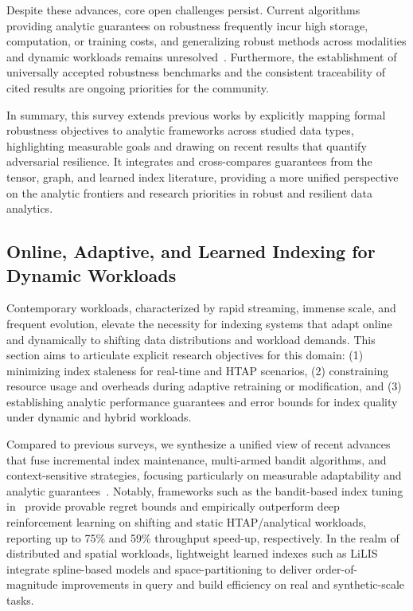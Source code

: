 \documentclass[sigconf]{acmart}
\begin{document}
Despite these advances, core open challenges persist. Current algorithms providing analytic guarantees on robustness frequently incur high storage, computation, or training costs, and generalizing robust methods across modalities and dynamic workloads remains unresolved~\cite{ref104,ref107,ref110,ref118}. Furthermore, the establishment of universally accepted robustness benchmarks and the consistent traceability of cited results are ongoing priorities for the community.

In summary, this survey extends previous works by explicitly mapping formal robustness objectives to analytic frameworks across studied data types, highlighting measurable goals and drawing on recent results that quantify adversarial resilience. It integrates and cross-compares guarantees from the tensor, graph, and learned index literature, providing a more unified perspective on the analytic frontiers and research priorities in robust and resilient data analytics.

\subsection{Online, Adaptive, and Learned Indexing for Dynamic Workloads}

Contemporary workloads, characterized by rapid streaming, immense scale, and frequent evolution, elevate the necessity for indexing systems that adapt online and dynamically to shifting data distributions and workload demands. This section aims to articulate explicit research objectives for this domain: (1) minimizing index staleness for real-time and HTAP scenarios, (2) constraining resource usage and overheads during adaptive retraining or modification, and (3) establishing analytic performance guarantees and error bounds for index quality under dynamic and hybrid workloads.

Compared to previous surveys, we synthesize a unified view of recent advances that fuse incremental index maintenance, multi-armed bandit algorithms, and context-sensitive strategies, focusing particularly on measurable adaptability and analytic guarantees~\cite{ref105,ref110}. Notably, frameworks such as the bandit-based index tuning in~\cite{ref105} provide provable regret bounds and empirically outperform deep reinforcement learning on shifting and static HTAP/analytical workloads, reporting up to 75\% and 59\% throughput speed-up, respectively. In the realm of distributed and spatial workloads, lightweight learned indexes such as LiLIS~\cite{ref111} integrate spline-based models and space-partitioning to deliver order-of-magnitude improvements in query and build efficiency on real and synthetic-scale tasks.
\end{document}
